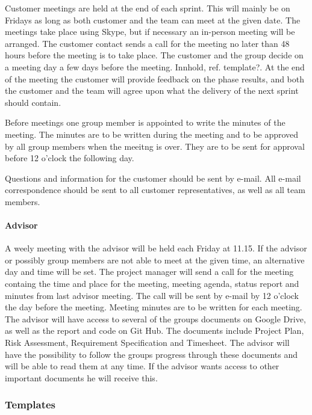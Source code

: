 Customer meetings are held at the end of each sprint. This will mainly be on Fridays as long as both customer and the team can meet at the given date. The meetings take place using Skype, but if necessary an in-person meeting will be arranged. The customer contact sends a call for the meeting no later than 48 hours before the meeting is to take place. The customer and the group decide on a meeting day a few days before the meeting. Innhold, ref. template?. At the end of the meeting the customer will provide feedback on the phase results, and both the customer and the team will agree upon what the delivery of the next sprint should contain.

Before meetings one group member is appointed to write the minutes of the meeting. The minutes are to be written during the meeting and to be approved by all group members when the meeitng is over. They are to be sent for approval before 12 o'clock the following day. 

Questions and information for the customer should be sent by e-mail. All e-mail correspondence should be sent to all customer representatives, as well as all team members.

\paragraph{Advisor}

A weely meeting with the advisor will be held each Friday at 11.15. If the advisor or possibly group members are not able to meet at the given time, an alternative day and time will be set. The project manager will send a call for the meeting containg the time and place for the meeting, meeting agenda, status report and minutes from last advisor meeting. The call will be sent by e-mail by 12 o'clock the day before the meeting. Meeting minutes are to be written for each meeting. The advisor will have access to several of the groups documents on Google Drive, as well as the report and code on Git Hub. The documents include Project Plan, Risk Assessment, Requirement Specification and Timesheet. The advisor will have the possibility to follow the groups progress through these documents and will be able to read them at any time. If the advisor wants access to other important documents he will receive this. 

\subsubsection{Templates}

